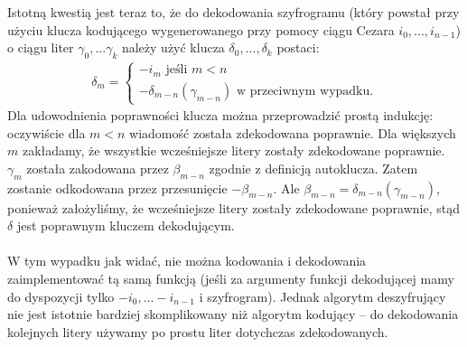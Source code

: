 \documentclass[a4paper]{article}
\theoremstyle{defn}
\theoremstyle{theorem}
\theoremstyle{lemma}
\theoremstyle{cor}
\theoremstyle{fact}
\begin{document}
Istotną kwestią jest teraz to, że do dekodowania szyfrogramu (który powstał przy użyciu klucza kodującego wygenerowanego przy pomocy ciągu Cezara $i_0, ..., i_{n-1}$) o ciągu liter $\gamma_0, ... \gamma_k$ należy użyć klucza $\delta_0, ..., \delta_k$ postaci:
\begin{align*}
\delta_m =
\begin{cases}
  -i_m \text{ jeśli } m < n  \\
  -\delta_{m-n}(\gamma_{m-n}) \text{ w przeciwnym wypadku}.
\end{cases}
\end{align*}
Dla udowodnienia poprawności klucza można przeprowadzić prostą indukcję: oczywiście dla $m < n$ wiadomość została zdekodowana poprawnie. Dla większych $m$ zakładamy, że wszystkie wcześniejsze litery zostały zdekodowane poprawnie. $\gamma_m$ została zakodowana przez $\beta_{m-n}$ zgodnie z definicją autoklucza. Zatem zostanie odkodowana przez przesunięcie $-\beta_{m-n}$. Ale $\beta_{m-n} = \delta_{m-n}(\gamma_{m-n})$, ponieważ założyliśmy, że wcześniejsze litery zostały zdekodowane poprawnie, stąd $\delta$ jest poprawnym kluczem dekodującym. \\\\
W tym wypadku jak widać, nie można kodowania i dekodowania zaimplementować tą samą funkcją (jeśli za argumenty funkcji dekodującej mamy do dyspozycji tylko $-i_0, ... -i_{n-1}$ i szyfrogram). Jednak algorytm deszyfrujący nie jest istotnie bardziej skomplikowany niż algorytm kodujący – do dekodowania kolejnych litery używamy po prostu liter dotychczas zdekodowanych. \\
\end{document}
